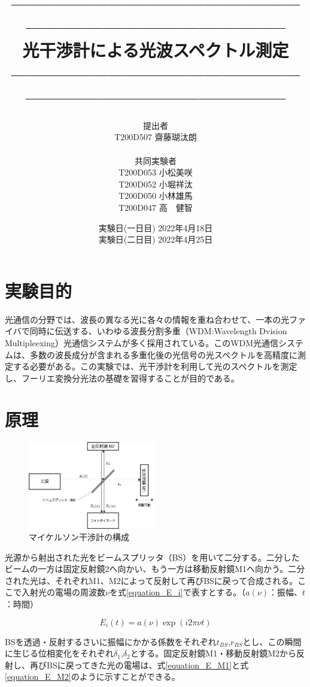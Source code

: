 \documentclass[uplatex, titlepage, fontsize=10pt, paper=a4paper]{jsarticle}
\title{
\vspace{-5cm}
--------------------------------------------------------------------------------------\\
\vspace{8mm}
{\Huge 光干渉計による光波スペクトル測定}\\
\vspace{6mm}
--------------------------------------------------------------------------------------}
\author{\huge
    \vspace{2mm}
    提出者\\
    \Large
    \vspace{2mm}
    T200D507 齋藤瑚汰朗\\\\
    \huge
    \vspace{2mm}
    共同実験者\\
    \Large
    \vspace{2mm}
    T200D053 小松美咲\\
    \Large
    \vspace{2mm}
    T200D052 小堀祥汰\\
    \Large
    \vspace{2mm}
    T200D050 小林雄馬\\
    \Large
    T200D047 高　健智
    \vspace{5mm}
}
\date{\LARGE
    実験日(一日目) 2022年4月18日\\
    \LARGE
    \vspace{2mm}
    実験日(二日目) 2022年4月25日
}
\numberwithin{equation}{section}
\begin{document}
\maketitle

\newpage

\section{実験目的}
光通信の分野では、波長の異なる光に各々の情報を重ね合わせて、一本の光ファイバで同時に伝送する、いわゆる波長分割多重（WDM:Wavelength Dvision Multipleexing）光通信システムが多く採用されている。このWDM光通信システムは、多数の波長成分が含まれる多重化後の光信号の光スペクトルを高精度に測定する必要がある。この実験では、光干渉計を利用して光のスペクトルを測定し、フーリエ変換分光法の基礎を習得することが目的である。

\section{原理}

\begin{figure}
    \centering
    \includegraphics[width = 0.5\textwidth]{画像フォルダ/Interferometer.png}
    \caption{マイケルソン干渉計の構成}
    \label{Michelson_interferometer}
\end{figure}

光源から射出された光をビームスプリッタ（BS）を用いて二分する。二分したビームの一方は固定反射鏡2へ向かい、もう一方は移動反射鏡M1へ向かう。二分された光は、それぞれM1、M2によって反射して再びBSに戻って合成される。ここで入射光の電場の周波数$\nu$を式\ref{equation_E_i}で表すとする。（$a(\nu)$：振幅、$t$：時間）

\begin{equation}
    E_{i}(t) = a(\nu)\exp(i2{\pi\nu}t)
    \label{equation_E_i}
\end{equation}

BSを透過・反射するさいに振幅にかかる係数をそれぞれ$t_{BS}$,$r_{BS}$とし、この瞬間に生じる位相変化をそれぞれ$\delta_{1}$,$\delta_{2}$とする。固定反射鏡M1・移動反射鏡M2から反射し、再びBSに戻ってきた光の電場は、式\ref{equation_E_M1}と式\ref{equation_E_M2}のように示すことができる。
\end{document}
